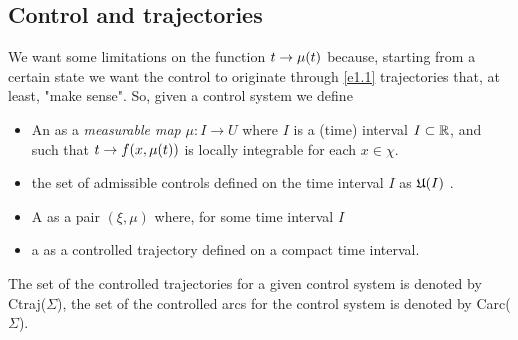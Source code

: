 \subsection{Control and trajectories}
We want some limitations on the function $t\rightarrow\mu(t)$ because, starting from a certain state we want the control to originate through \eqref{e1.1} trajectories that, at least, "make sense". So, given a control system \controlSystemSpaced we define
\begin{itemize}
	\item An  as a \textit{measurable map} $\mu:I\rightarrow U$ where $I$ is a (time) interval $I\subset\mathbb{R}$, and such that $t\rightarrow f(x,\mu(t) )$ is locally integrable for each $x\in\chi$.
	\item the set of admissible controls defined on the time interval $I$ as $\mathfrak{U}(I)$	.
	\item A  as a pair $(\xi,\mu)$ where, for some time interval $I$
	\item a  as a controlled trajectory defined on a compact time interval.
\end{itemize}
The set of the controlled trajectories for a given control system \controlSystemSpaced is denoted by Ctraj($\Sigma$), the set of the controlled arcs for the control system is denoted by Carc($\Sigma$).


